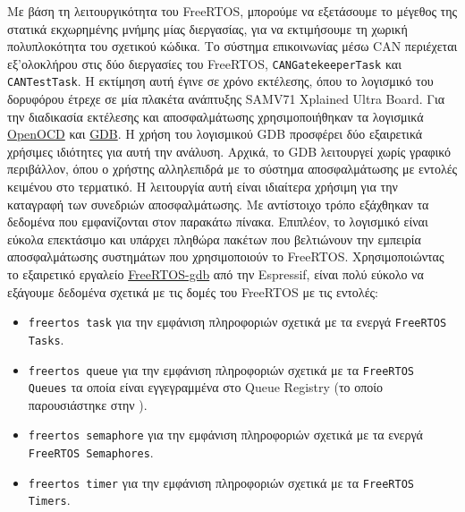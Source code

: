 \documentclass[a4paper,nobib,justified]{tufte-book}
\begin{document}
Με βάση τη λειτουργικότητα του FreeRTOS, μπορούμε να εξετάσουμε το μέγεθος της στατικά εκχωρημένης μνήμης μίας διεργασίας, για να εκτιμήσουμε τη χωρική πολυπλοκότητα του σχετικού κώδικα. Το σύστημα επικοινωνίας μέσω CAN περιέχεται εξ'ολοκλήρου στις δύο διεργασίες του FreeRTOS, \texttt{CANGatekeeperTask} και \texttt{CANTestTask}. Η εκτίμηση αυτή έγινε σε χρόνο εκτέλεσης, όπου το λογισμικό του δορυφόρου έτρεχε σε μία πλακέτα ανάπτυξης SAMV71 Xplained Ultra Board. Για την διαδικασία εκτέλεσης και αποσφαλμάτωσης χρησιμοποιήθηκαν τα λογισμικά \href{https://openocd.org/}{OpenOCD} και \href{https://www.gnu.org/savannah-checkouts/gnu/gdb/index.html}{GDB}. Η χρήση του λογισμικού GDB προσφέρει δύο εξαιρετικά χρήσιμες ιδιότητες για αυτή την ανάλυση. Αρχικά, το GDB λειτουργεί χωρίς γραφικό περιβάλλον, όπου ο χρήστης αλληλεπιδρά με το σύστημα αποσφαλμάτωσης με εντολές κειμένου στο τερματικό. Η λειτουργία αυτή είναι ιδιαίτερα χρήσιμη για την καταγραφή των συνεδριών αποσφαλμάτωσης. Με αντίστοιχο τρόπο εξάχθηκαν τα δεδομένα που εμφανίζονται στον παρακάτω πίνακα. Επιπλέον, το λογισμικό είναι εύκολα επεκτάσιμο και υπάρχει πληθώρα πακέτων που βελτιώνουν την εμπειρία αποσφαλμάτωσης συστημάτων που χρησιμοποιούν το FreeRTOS. Χρησιμοποιώντας το εξαιρετικό εργαλείο \href{https://github.com/espressif/freertos-gdb}{FreeRTOS-gdb} από την Espressif, είναι πολύ εύκολο να εξάγουμε δεδομένα σχετικά με τις δομές του FreeRTOS με τις εντολές:


\begin{itemize}
	\item \texttt{freertos task} για την εμφάνιση πληροφοριών σχετικά με τα ενεργά \texttt{FreeRTOS Tasks}.
	\item \texttt{freertos queue} για την εμφάνιση πληροφοριών σχετικά με τα \texttt{FreeRTOS Queues} τα οποία είναι εγγεγραμμένα στο Queue Registry (το οποίο παρουσιάστηκε στην ).
	\item \texttt{freertos semaphore} για την εμφάνιση πληροφοριών σχετικά με τα ενεργά \texttt{FreeRTOS Semaphores}.
	\item \texttt{freertos timer} για την εμφάνιση πληροφοριών σχετικά με τα \texttt{FreeRTOS Timers}.
\end{itemize}
\end{document}
